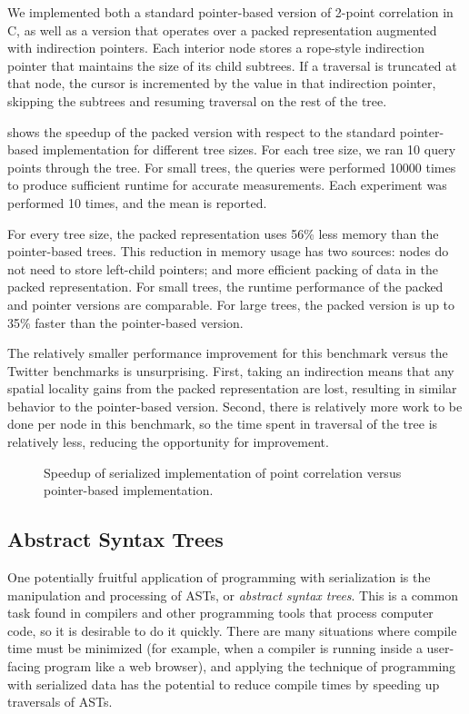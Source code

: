 We implemented both a standard pointer-based version of 2-point correlation in
C, as well as a version that operates over a packed representation augmented
with indirection pointers. Each interior node stores a rope-style
indirection pointer that maintains the size of its child subtrees. If a
traversal is truncated at that node, the cursor is incremented by the value in
that indirection pointer, skipping the subtrees and resuming traversal on the
rest of the tree.

 shows the speedup of the packed version
with respect to the standard pointer-based implementation for
different tree sizes. For each tree size, we ran 10 query points
through the tree. For small trees, the queries were performed 10000
times to produce sufficient runtime for accurate measurements. Each
experiment was performed 10 times, and the mean is reported.

For every tree size, the packed representation uses 56\% less memory
than the pointer-based trees. This reduction in memory usage has two
sources: nodes do not need to store left-child pointers; and more
efficient packing of data in the packed representation. For small
trees, the runtime performance of the packed and pointer versions are
comparable. For large trees, the packed version is up to 35\% faster
than the pointer-based version.

The relatively smaller performance improvement for this
benchmark versus the Twitter benchmarks is unsurprising. First, taking an
indirection means that any spatial locality gains from the packed
representation are lost, resulting in similar behavior to the
pointer-based version. Second, there is relatively more work to be
done per node in this benchmark, so the time spent in traversal of the
tree is relatively less, reducing the opportunity for improvement.


\begin{figure}
  \centering
  
  \caption{Speedup of serialized implementation of point correlation versus
    pointer-based implementation.}
  \label{fig:point_corr_plot}
\end{figure}

\subsection{Abstract Syntax Trees}\label{subsec:ast}

One potentially fruitful application of programming with serialization is
the manipulation and processing of ASTs, or \emph{abstract syntax trees}.
This is a common task found in compilers and other programming tools that
process computer code, so it is desirable to do it quickly. There are many
situations where compile time must be minimized (for example, when a compiler
is running inside a user-facing program like a web browser), and applying
the technique of programming with serialized data has the potential to reduce
compile times by speeding up traversals of ASTs.

